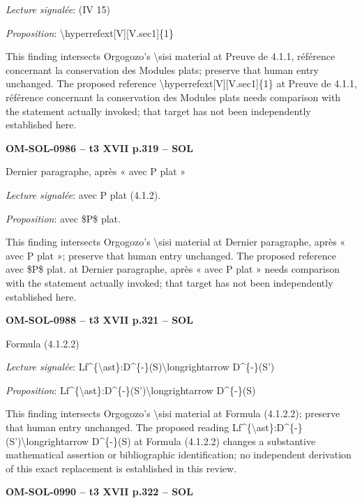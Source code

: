 \emph{Lecture signalée}: (IV 15)\par
\emph{Proposition}: \textbackslash{}hyperrefext[V][V.sec1]\{1\}\par
This finding intersects Orgogozo's \textbackslash{}sisi material at Preuve de 4.1.1, référence concernant la conservation des Modules plats; preserve that human entry unchanged. The proposed reference \textbackslash{}hyperrefext[V][V.sec1]\{1\} at Preuve de 4.1.1, référence concernant la conservation des Modules plats needs comparison with the statement actually invoked; that target has not been independently established here.\par
\par\noindent\textbf{OM-SOL-0986 -- t3 XVII p.319 -- SOL}\par
Dernier paragraphe, après « avec P plat »\par
\emph{Lecture signalée}: avec P plat (4.1.2).\par
\emph{Proposition}: avec \$P\$ plat.\par
This finding intersects Orgogozo's \textbackslash{}sisi material at Dernier paragraphe, après « avec P plat »; preserve that human entry unchanged. The proposed reference avec \$P\$ plat. at Dernier paragraphe, après « avec P plat » needs comparison with the statement actually invoked; that target has not been independently established here.\par
\par\noindent\textbf{OM-SOL-0988 -- t3 XVII p.321 -- SOL}\par
Formula (4.1.2.2)\par
\emph{Lecture signalée}: Lf\textasciicircum{}\{\textbackslash{}ast\}:D\textasciicircum{}\{-\}(S)\textbackslash{}longrightarrow D\textasciicircum{}\{-\}(S')\par
\emph{Proposition}: Lf\textasciicircum{}\{\textbackslash{}ast\}:D\textasciicircum{}\{-\}(S')\textbackslash{}longrightarrow D\textasciicircum{}\{-\}(S)\par
This finding intersects Orgogozo's \textbackslash{}sisi material at Formula (4.1.2.2); preserve that human entry unchanged. The proposed reading Lf\textasciicircum{}\{\textbackslash{}ast\}:D\textasciicircum{}\{-\}(S')\textbackslash{}longrightarrow D\textasciicircum{}\{-\}(S) at Formula (4.1.2.2) changes a substantive mathematical assertion or bibliographic identification; no independent derivation of this exact replacement is established in this review.\par
\par\noindent\textbf{OM-SOL-0990 -- t3 XVII p.322 -- SOL}\par
